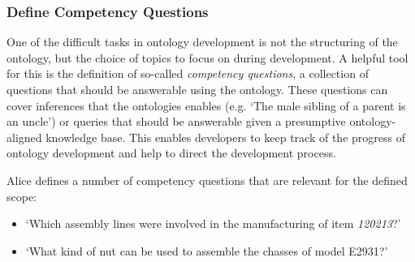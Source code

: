 \subsubsection{Define Competency Questions}
\label{Define_Competency_Questions}

One of the difficult tasks in ontology development is not the structuring of the ontology, but the choice of topics to focus on during development. A helpful tool for this is the definition of so-called \textit{competency questions}, a collection of questions that should be answerable using the ontology. 
These questions can cover inferences that the ontologies enables (e.g. `The male sibling of a parent is an uncle') or queries that should be answerable given a presumptive ontology-aligned knowledge base. This enables developers to keep track of the progress of ontology development and help to direct the development process. 


\begin{example}
Alice defines a number of competency questions that are relevant for the defined scope:
\begin{itemize}
    \item `Which assembly lines were involved in the manufacturing of item \textit{120213}?'
    \item `What kind of nut can be used to assemble the chasses of model E2931?'
\end{itemize}

\end{example}